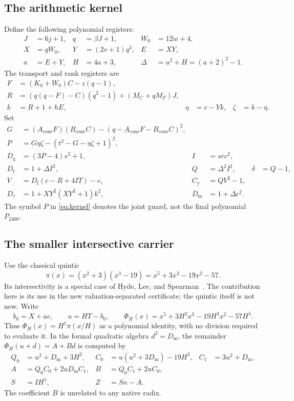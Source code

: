 \documentclass[11pt,a4paper]{article}
\theoremstyle{remark}\newtheorem{remark}[theorem]{Remark}
\newcommand{\Dm}{D_{\mathrm m}}\newcommand{\Df}{D_{\mathrm f}}
\newcommand{\Dt}{D_{\tau}}\newcommand{\Dg}{D_{\mathrm g}}
\newcommand{\Cc}{C_{\mathrm y}}
\newcommand{\Acone}{A_{\mathrm{cone}}}\newcommand{\Bcone}{B_{\mathrm{cone}}}
\newcommand{\primary}{P_{2400}}\newcommand{\companion}{P_{2912}}
\begin{document}
\subsection{The arithmetic kernel}
Define the following polynomial registers:
\begin{align}
 J&=6j+1,& q&=\beta J+1,& W_0&=12w+4,\nonumber\\
 X&=qW_0,& Y&=(2v+1)q^3,& E&=XY,\nonumber\\
 a&=E+Y,& H&=4a+3,& \Delta&=a^2+H=(a+2)^2-1.
 \label{eq:outer}
\end{align}
The transport and rank registers are
\begin{align}
 F&=(K_0+W_0)C-z(q-1),\nonumber\\
 R&=(q(q-F)-C)(q^2-1)+(M_C+qM_F)J,\nonumber\\
 k&=R+1+hE,& \eta&=c-Yk,& \zeta&=k-\eta. \label{eq:transport}
\end{align}
Set
\begin{align}
 G&=(\Acone F)(\Bcone C)-(q-\Acone F-\Bcone C)^2,\nonumber\\
 P&=G\eta\zeta-(t^2-G-\eta\zeta+1)^2,\nonumber\\
 \Dg&=(3P-4)s^2+1,& I&=src^2,\nonumber\\
 \Df&=1+\Delta I^2,& Q&=\Delta^2 I^2,& \delta&=Q-1,\nonumber\\
 V&=\Df(c-R+4IT)-c,& \Cc&=QV^2-1,\nonumber\\
 \Dt&=1+XY^2(XY^2+1)k^2,&
 \Dm&=1+\Delta c^2. \label{eq:kernel}
\end{align}
The symbol $P$ in \eqref{eq:kernel} denotes the joint guard, not the final
polynomial $\primary$.

\subsection{The smaller intersective carrier}
Use the classical quintic
\begin{equation}\label{eq:pi}
 \pi(x)=(x^2+3)(x^3-19)=x^5+3x^3-19x^2-57.
\end{equation}
Its intersectivity is a special case of Hyde, Lee, and
Spearman~\cite{hls}. The contribution here is its use in the new
valuation-separated certificate; the quintic itself is not new.
Write
\[
 b_0=X+ac,\qquad u=HT-b_0,\qquad
 \Phi_H(x)=x^5+3H^2x^3-19H^3x^2-57H^5.
\]
Thus $\Phi_H(x)=H^5\pi(x/H)$ as a polynomial identity, with no division
required to evaluate it. In the formal quadratic algebra $d^2=\Dm$,
the remainder $\Phi_H(u+d)=A+Bd$ is computed by
\begin{align}
 Q_0&=u^2+\Dm+3H^2,&
 C_0&=u(u^2+3\Dm)-19H^3,&
 C_1&=3u^2+\Dm,\nonumber\\
 A&=Q_0C_0+2u\Dm C_1,&
 B&=Q_0C_1+2uC_0,\nonumber\\
 S&=IH^5,& Z&=Sn-A. \label{eq:carrier}
\end{align}
The coefficient $B$ is unrelated to any native radix.
\end{document}
